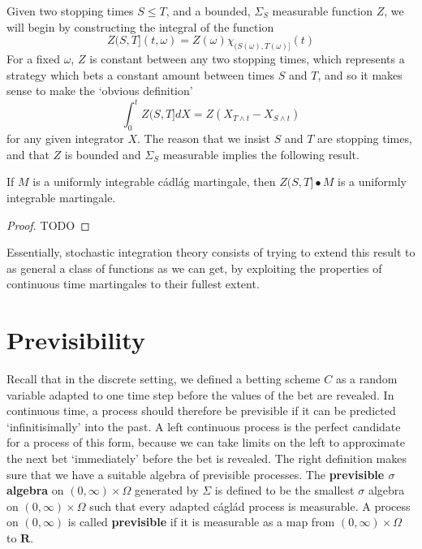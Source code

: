 
Given two stopping times $S \leq T$, and a bounded, $\Sigma_S$ measurable function $Z$, we will begin by constructing the integral of the function
%
\[ Z(S,T](t,\omega) = Z(\omega) \chi_{(S(\omega),T(\omega)]}(t) \]
%
For a fixed $\omega$, $Z$ is constant between any two stopping times, which represents a strategy which bets a constant amount between times $S$ and $T$, and so it makes sense to make the `obvious definition'
%
\[ \int_0^t Z(S,T] dX = Z(X_{T \wedge t} - X_{S \wedge t}) \]
%
for any given integrator $X$. The reason that we insist $S$ and $T$ are stopping times, and that $Z$ is bounded and $\Sigma_S$ measurable implies the following result.

\begin{lemma}
    If $M$ is a uniformly integrable c\'{a}dl\'{a}g martingale, then $Z(S,T] \bullet M$ is a uniformly integrable martingale.
\end{lemma}
\begin{proof}
    TODO
\end{proof}

Essentially, stochastic integration theory consists of trying to extend this result to as general a class of functions as we can get, by exploiting the properties of continuous time martingales to their fullest extent.

\section{Previsibility}

Recall that in the discrete setting, we defined a betting scheme $C$ as a random variable adapted to one time step before the values of the bet are revealed. In continuous time, a process should therefore be previsible if it can be predicted `infinitisimally' into the past. A left continuous process is the perfect candidate for a process of this form, because we can take limits on the left to approximate the next bet `immediately' before the bet is revealed. The right definition makes sure that we have a suitable algebra of previsible processes. The {\bf previsible $\sigma$ algebra} on $(0,\infty) \times \Omega$ generated by $\Sigma$ is defined to be the smallest $\sigma$ algebra on $(0,\infty) \times \Omega$ such that every adapted c\'{a}gl\'{a}d process is measurable. A process on $(0,\infty)$ is called {\bf previsible} if it is measurable as a map from $(0,\infty) \times \Omega$ to $\mathbf{R}$.

